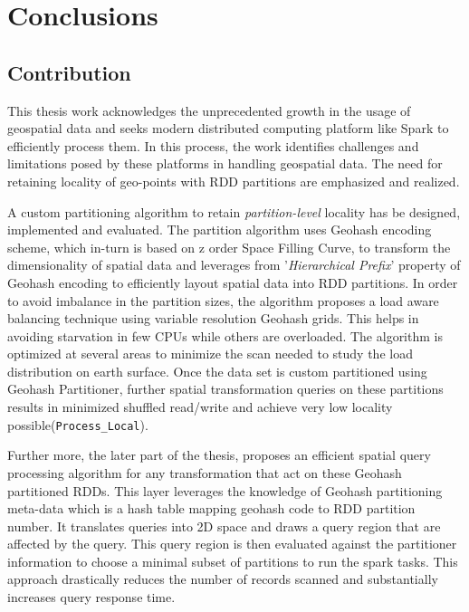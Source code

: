 \documentclass[article,type=msc,colorback,12pt,accentcolor=tud1d]{tudthesis}
\begin{document}
  \cleardoublepage
  
  \hfill
  \section{Conclusions}
  \hfill
		   \subsection{Contribution}
		   
		   This thesis work acknowledges the unprecedented growth in the usage of geospatial data and seeks modern distributed computing platform like Spark to efficiently process them. In this process, the work identifies challenges and limitations posed by these platforms in handling geospatial data. The need for retaining locality of geo-points with RDD partitions are emphasized and realized.
		   
		   A custom partitioning algorithm to retain \textit{partition-level} locality has be designed, implemented and evaluated. The partition algorithm uses Geohash encoding scheme, which in-turn is based on z order Space Filling Curve, to transform the dimensionality of spatial data and leverages from '\textit{Hierarchical Prefix}' property of Geohash encoding to efficiently layout spatial data into RDD partitions. In order to avoid imbalance in the partition sizes, the algorithm proposes a load aware balancing technique using variable resolution Geohash grids. This helps in avoiding starvation in few CPUs while others are overloaded. The algorithm is optimized at several areas to minimize the scan needed to study the load distribution on earth surface. Once the data set is custom partitioned using Geohash Partitioner, further spatial transformation queries on these partitions results in minimized shuffled read/write and achieve very low locality possible(\texttt{Process\_Local}). 
		   
		   Further more, the later part of the thesis, proposes an efficient spatial query processing algorithm for any transformation that act on these Geohash partitioned RDDs. This layer leverages the knowledge of Geohash partitioning meta-data which is a hash table mapping geohash code to RDD partition number. It translates queries into 2D space and draws a query region that are affected by the query. This query region is then evaluated against the partitioner information to choose a minimal subset of partitions to run the spark tasks. This approach drastically reduces the number of records scanned and substantially increases query response time. 
		   
\end{document}
